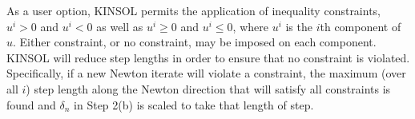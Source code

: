As a user option, KINSOL permits the application of inequality
constraints, $u^i > 0$ and $u^i < 0$ as well as $u^i \geq 0$ and
$u^i \leq 0$, where $u^i$ is the $i$th component of $u$. Either
constraint, or no constraint, may be imposed on each component.
KINSOL will reduce step lengths in order to ensure that no
constraint is violated.  Specifically, if a new Newton iterate
will violate a constraint, the maximum (over all $i$) step length
along the Newton direction that will satisfy all constraints is
found and $\delta_n$ in Step 2(b) is scaled to take that length of
step.
